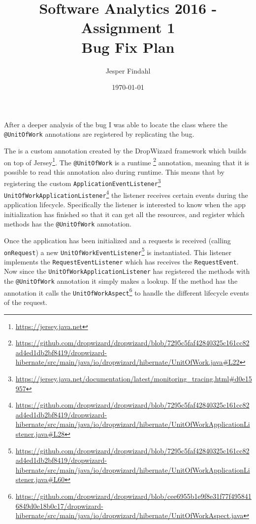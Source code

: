 \documentclass[11pt]{article}
\begin{document}
\title{\Large Software Analytics 2016 - Assignment 1 \\\vspace{0.7cm} \huge Bug Fix Plan}
\date{\today}
\author{Jesper Findahl}
\maketitle
\thispagestyle{empty}



After a deeper analysis of the bug I was able to locate the class where the \texttt{@UnitOfWork} annotations are registered by replicating the bug.

The  is a custom annotation created by the DropWizard framework which builds on top of Jersey\footnote{\url{https://jersey.java.net}}. The \texttt{@UnitOfWork} is a runtime \footnote{\url{https://github.com/dropwizard/dropwizard/blob/7295c5faf42840325c161cc82ad4ed1db2bf8419/dropwizard-hibernate/src/main/java/io/dropwizard/hibernate/UnitOfWork.java#L22}} annotation, meaning that it is possible to read this annotation also during runtime. This means that by registering the custom \texttt{ApplicationEventListener}\footnote{\url{https://jersey.java.net/documentation/latest/monitoring_tracing.html#d0e15957}} \texttt{UnitOfWorkApplicationListener}\footnote{\url{https://github.com/dropwizard/dropwizard/blob/7295c5faf42840325c161cc82ad4ed1db2bf8419/dropwizard-hibernate/src/main/java/io/dropwizard/hibernate/UnitOfWorkApplicationListener.java#L28}} the listener receives certain events during the application lifecycle. Specifically the listener is interested to know when the app initialization has finished so that it can get all the resources, and register which methods has the \texttt{@UnitOfWork} annotation.

Once the application has been initialized and a requests is received (calling \texttt{onRequest}) a new \texttt{UnitOfWorkEventListener}\footnote{\url{https://github.com/dropwizard/dropwizard/blob/7295c5faf42840325c161cc82ad4ed1db2bf8419/dropwizard-hibernate/src/main/java/io/dropwizard/hibernate/UnitOfWorkApplicationListener.java#L60}} is instantiated. This listener implements the \texttt{RequestEventListener} which has receives the \texttt{RequestEvent}. Now since the \texttt{UnitOfWorkApplicationListener} has registered the methods with the \texttt{@UnitOfWork} annotation it simply makes a lookup. If the method has the annotation it calls the \texttt{UnitOfWorkAspect}\footnote{\url{https://github.com/dropwizard/dropwizard/blob/cee6955b1e9f8e31f77f4958416849d0e18b0c17/dropwizard-hibernate/src/main/java/io/dropwizard/hibernate/UnitOfWorkAspect.java}} to handle the different lifecycle events of the request.
\end{document}
